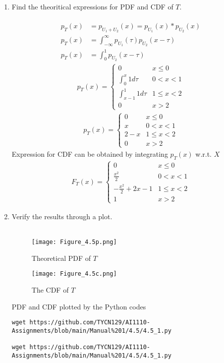 \documentclass[journal,12pt,twocolumn]{IEEEtran}
\renewcommand\thesection{\arabic{section}}
\begin{document}
\begin{enumerate}[label=\thesection.\arabic*
,ref=\thesection.\theenumi]
\item Find the theoritical expressions for PDF and CDF of $T$.\\
\solution\\
\begin{align}
    p_T(x) &= p_{U_1 + U_2}(x) = p_{U_1}(x) * p_{U_2}(x)\\
    p_T(x) &= \int_{-\infty}^{\infty}p_{U_1}(\tau)p_{U_2}(x - \tau)\\
    p_T(x) &= \int_0^1p_{U_2}(x - \tau)
\end{align}
\begin{align}
    \displaystyle p_T(x) = \begin{cases} 
    0 & \text{$x \leq 0$} \\  
    \int_0^x 1d\tau & \text{$0 < x < 1$} \\  
    \int_{x - 1}^1 1d\tau & \text{$1 \leq x < 2$} \\
    0 & \text{$x > 2$}
    \end{cases}
\end{align}
\begin{align}
    \displaystyle p_T(x) = \begin{cases} 
    0 & \text{$x \leq 0$} \\  
    x & \text{$0 < x < 1$} \\  
    2 - x & \text{$1 \leq x < 2$} \\
    0 & \text{$x > 2$}
    \end{cases}
\end{align}
Expression for CDF can be obtained by integrating $p_T(x)$ w.r.t. $X$
\begin{align}
    \displaystyle F_T(x) = \begin{cases} 
    0 & \text{$x \leq 0$} \\  
    \frac{x^2}{2} & \text{$0 < x < 1$} \\  
    -\frac{x^2}{2} + 2x - 1 & \text{$1 \leq x < 2$} \\
    1 & \text{$x > 2$}
    \end{cases}
\end{align}

\item Verify the results through a plot.\\
\solution\\
\begin{figure}[h!]
    \centering
    \texttt{[image: Figure\_4.5p.png]}
    \caption{Theoretical PDF of $T$}
    \label{fig:my_label}
\end{figure}
\begin{figure}[H]
    \centering
    \texttt{[image: Figure\_4.5c.png]}
    \caption{The CDF of $T$}
    \label{fig:my_label}
\end{figure}
PDF and CDF plotted by the Python codes
\begin{lstlisting}
wget https://github.com/TYCN129/AI1110-Assignments/blob/main/Manual%201/4.5/4.5_1.py

wget https://github.com/TYCN129/AI1110-Assignments/blob/main/Manual%201/4.5/4.5_1.py
\end{lstlisting}
\end{enumerate}
\end{document}
